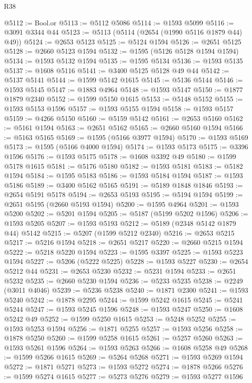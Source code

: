 \begin{lexlean}{R38}
\begin{coremodule}
@5112 := Bool.or
@5113 := @5112 @5086
@5114 := @1593 @5099
@5116 := @3091 @3344 @44
@5123 := @5113 (@5114 (@2654 (@1990 @5116 @1879 @44) @49))
@5124 := @2653 @5123
@5125 := @5124 @1594
@5126 := @2651 @5125
@5128 := @2660 @5123 @1594
@5132 := @1595 (@5126 @5128 @1594 @1594)
@5134 := @1593 @5132 @1594
@5135 := @1595 @5134
@5136 := @1593 @5135
@5137 := @1608 @5116
@5141 := @3400 @5125 @5128 @49 @44
@5142 := @5137 @5141
@5144 := @1599 @5142 @1615
@5145 := @5136 @5144
@5146 := @1593 @5145
@5147 := @1883 @4964
@5148 := @1593 @5147
@5150 := @1877 @1879 @2340
@5152 := @1599 @5150 @1615
@5153 := @5148 @5152
@5155 := @1593 @5153 @1596
@5157 := @1593 @5155 @1594
@5158 := @1593 @5157
@5159 := @4266 @5150
@5160 := @5159 @5142
@5161 := @2653 @5160
@5162 := @5161 @1594
@5163 := @2651 @5162
@5165 := @2660 @5160 @1594
@5166 := @5163 @5165
@5169 := @1595 (@5166 @3977 @1594)
@5170 := @1593 @5169
@5173 := @1595 (@5166 @4000 @1594)
@5174 := @1593 @5173
@5175 := @3396 @1596
@5176 := @1593 @5175
@5178 := @1608 @3392 @49
@5180 := @1599 @5178 @1615
@5181 := @5176 @5180
@5182 := @1593 @5181
@5183 := @5182 @1594
@5184 := @1595 @5183
@5186 := @1593 @5184 @1594
@5187 := @1593 @5186
@5189 := @3400 @5162 @5165
@5191 := @5189 @1848 @1846
@5193 := @2654 @5191 @5178
@5194 := @2653 @5193
@5195 := @5194 @1594
@5199 := @2651 @5195 (@2660 @5193 @1594)
@5200 := @1595 @4964
@5201 := @1593 @5200
@5202 := @5201 @1594
@5205 := @5187 (@5199 @5202 @1596)
@5206 := @1593 @5205
@5207 := @1593 @5193
@5212 := @5189 (@2348 @5142 @1879 @44) @5142
@5215 := @5207 (@1599 @5212 @2340)
@5216 := @2653 @5215
@5217 := @5216 @1594
@5218 := @2651 @5217
@5220 := @2660 @5215 @1594
@5222 := @5218 @5220 @1594
@5223 := @1595 @3397
@5225 := @1593 @5223 @1594
@5227 := @5206 (@5222 @5225)
@5228 := @1593 @5227
@5230 := @2654 @5212 @44
@5231 := @2653 @5230
@5232 := @5231 @1594
@5233 := @2651 @5232
@5235 := @2660 @5230 @1594
@5236 := @5233 @5235
@5238 := @2249 (@3011 @4046)
@5239 := @5236 @5238
@5240 := @1871 @2300
@5241 := @1593 @5240
@5242 := @1878 @2295
@5244 := @1599 @5242 @1615
@5245 := @5241 @5244
@5247 := @1593 @5245 @1596
@5248 := @1593 @5247
@5250 := @1608 @5242 @49
@5252 := @1599 @5250 @1615
@5253 := @5248 @5252
@5255 := @1593 @5253 @1594
@5256 := @1871 @5255
@5257 := @1593 @5256
@5258 := @1878 @5250
@5260 := @1599 @5258 @1615
@5261 := @5257 @5260
@5263 := @1593 @5261 @1596
@5264 := @1593 @5263
@5266 := @1608 @5258 @49
@5268 := @1599 @5266 @1615
@5269 := @5264 @5268
@5271 := @1593 @5269 @1594
@5272 := @1871 @5271
@5273 := @1593 @5272
@5274 := @1878 @5266
@5276 := @1599 @5274 @1615
@5277 := @5273 @5276
@5279 := @1593 @5277 @1596

\end{coremodule}
\end{lexlean}
